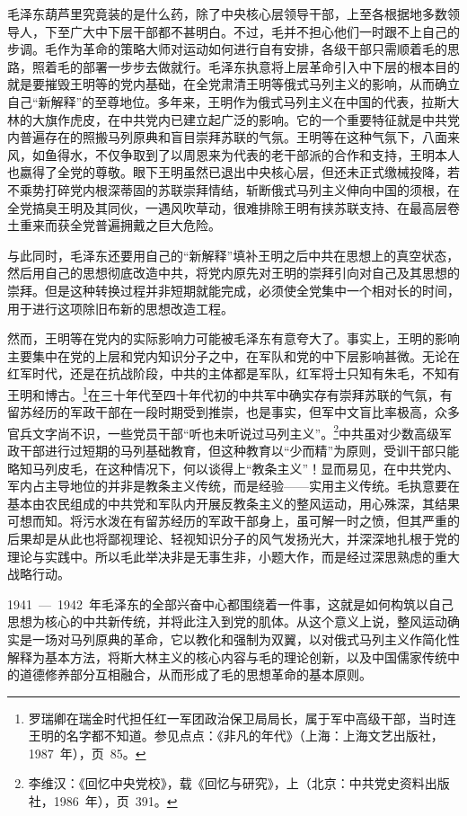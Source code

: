毛泽东葫芦里究竟装的是什么药，除了中央核心层领导干部，上至各根据地多数领导人，下至广大中下层干部都不甚明白。不过，毛并不担心他们一时跟不上自己的步调。毛作为革命的策略大师对运动如何进行自有安排，各级干部只需顺着毛的思路，照着毛的部署一步步去做就行。毛泽东执意将上层革命引入中下层的根本目的就是要摧毁王明等的党内基础，在全党肃清王明等俄式马列主义的影响，从而确立自己“新解释”的至尊地位。多年来，王明作为俄式马列主义在中国的代表，拉斯大林的大旗作虎皮，在中共党内已建立起广泛的影响。它的一个重要特征就是中共党内普遍存在的照搬马列原典和盲目崇拜苏联的气氛。王明等在这种气氛下，八面来风，如鱼得水，不仅争取到了以周恩来为代表的老干部派的合作和支持，王明本人也嬴得了全党的尊敬。眼下王明虽然已退出中央核心层，但还未正式缴械投降，若不乘势打碎党内根深蒂固的苏联崇拜情结，斩断俄式马列主义伸向中国的须根，在全党搞臭王明及其同伙，一遇风吹草动，很难排除王明有挟苏联支持、在最高层卷土重来而获全党普遍拥戴之巨大危险。

与此同时，毛泽东还要用自己的“新解释”填补王明之后中共在思想上的真空状态，然后用自己的思想彻底改造中共，将党内原先对王明的崇拜引向对自己及其思想的崇拜。但是这种转换过程并非短期就能完成，必须使全党集中一个相对长的时间，用于进行这项除旧布新的思想改造工程。

然而，王明等在党内的实际影响力可能被毛泽东有意夸大了。事实上，王明的影响主要集中在党的上层和党内知识分子之中，在军队和党的中下层影响甚微。无论在红军时代，还是在抗战阶段，中共的主体都是军队，红军将士只知有朱毛，不知有王明和博古。\footnote{罗瑞卿在瑞金时代担任红一军团政治保卫局局长，属于军中高级干部，当时连王明的名字都不知道。参见点点：《非凡的年代》（上海：上海文艺出版社，1987~年），页~85。}在三十年代至四十年代初的中共军中确实存有崇拜苏联的气氛，有留苏经历的军政干部在一段时期受到推崇，也是事实，但军中文盲比率极高，众多官兵文字尚不识，一些党员干部“听也未听说过马列主义”。\footnote{李维汉：《回忆中央党校》，载《回忆与研究》，上（北京：中共党史资料出版社，1986~年），页~391。}中共虽对少数高级军政干部进行过短期的马列基础教育，但这种教育以“少而精”为原则，受训干部只能略知马列皮毛，在这种情况下，何以谈得上“教条主义”！显而易见，在中共党内、军内占主导地位的并非是教条主义传统，而是经验——实用主义传统。毛执意要在基本由农民组成的中共党和军队内开展反教条主义的整风运动，用心殊深，其结果可想而知。将污水泼在有留苏经历的军政干部身上，虽可解一时之愤，但其严重的后果却是从此也将鄙视理论、轻视知识分子的风气发扬光大，并深深地扎根于党的理论与实践中。所以毛此举决非是无事生非，小题大作，而是经过深思熟虑的重大战略行动。

1941~—~1942~年毛泽东的全部兴奋中心都围绕着一件事，这就是如何构筑以自己思想为核心的中共新传统，并将此注入到党的肌体。从这个意义上说，整风运动确实是一场对马列原典的革命，它以教化和强制为双翼，以对俄式马列主义作简化性解释为基本方法，将斯大林主义的核心内容与毛的理论创新，以及中国儒家传统中的道德修养部分互相融合，从而形成了毛的思想革命的基本原则。

